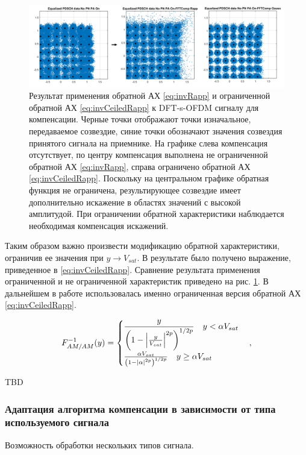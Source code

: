 \begin{figure}[h!]
    \centering
    \includegraphics[width=0.9\linewidth]{figs/ceiled_rapp_result.png}
    \caption{Результат применения обратной АХ \ref{eq:invRapp} и
    ограниченной обратной АХ \ref{eq:invCeiledRapp} к DFT-s-OFDM сигналу
    для компенсации. Черные точки отображают точки изначальное,
    передаваемое созвездие, синие точки обозначают значения созвездия
    принятого сигнала на приемнике. На графике слева компенсация
    отсутствует, по центру компенсация выполнена не ограниченной обратной
    АХ \ref{eq:invRapp}, справа ограничено обратной АХ
    \ref{eq:invCeiledRapp}. Поскольку на центральном графике обратная
    функция не ограничена, результирующее созвездие имеет дополнительно
    искажение в областях значений с высокой амплитудой. При ограничении
    обратной характеристики наблюдается необходимая компенсация искажений.}
    \label{fig:inf_distortion}
\end{figure}

Таким образом важно произвести модификацию обратной характеристики,
ограничив ее значения при $y \rightarrow V_{sat}$. В результате было
получено выражение, приведенное в \ref{eq:invCeiledRapp}. Сравнение
результата применения ограниченной и не ограниченной характеристик
приведено на рис. \ref{fig:inf_distortion}. В дальнейшем в работе
использовалась именно ограниченная версия обратной АХ \ref{eq:invCeiledRapp}.

\begin{equation}
    F^{-1}_{AM/AM}(y) = 
    \begin{cases}
        \displaystyle
       \frac{ y}{\left( 1 - \abs{\frac{y}{V_{sat}}}^{2p}\right)^{1/2p}}
       \quad y <\alpha V_{sat}\\
       \frac{ \alpha V_{sat}}{\left( 1 - \abs{\alpha}^{2p}\right)^{1/2p}}
       \quad y \geq \alpha V_{sat}
    \end{cases},
    \label{eq:invCeiledRapp}
\end{equation}




TBD





\subsubsection{Адаптация алгоритма компенсации в зависимости от типа используемого сигнала}
\label{sec:apadt}
Возможность обработки нескольких типов сигнала.
